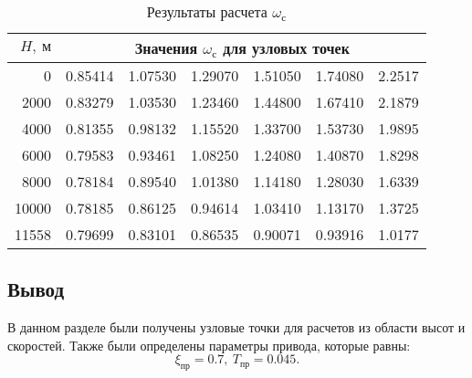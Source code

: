 \begin{table}[H]
    \centering
    \caption{Результаты расчета $\omega_{\text{с}}$}
    \label{tab:driver_tab}
    \begin{tabular}{|r|rrrrrr|}
    \hline
    $H,\ м$ & \multicolumn{6}{c|}{Значения $\omega_с$ для узловых точек}\\
    \hline
0 & 0.85414 & 1.07530 & 1.29070 & 1.51050 & 1.74080 & 2.2517\cellcolor{green} \\
2000 & 0.83279 & 1.03530 & 1.23460 & 1.44800 & 1.67410 &                  2.1879 \\
4000 & 0.81355 & 0.98132 & 1.15520 & 1.33700 & 1.53730 &                  1.9895 \\
6000 & 0.79583 & 0.93461 & 1.08250 & 1.24080 & 1.40870 &                  1.8298 \\
8000 & 0.78184 & 0.89540 & 1.01380 & 1.14180 & 1.28030 &                  1.6339 \\
10000 & 0.78185 & 0.86125 & 0.94614 & 1.03410 & 1.13170 &                  1.3725 \\
11558 & 0.79699 & 0.83101 & 0.86535 & 0.90071 & 0.93916 &                  1.0177 \\
    \hline
    \end{tabular}
\end{table}

\subsection{Вывод}
В данном разделе были получены узловые точки для расчетов из области высот и скоростей. Также были определены параметры привода, которые равны:
\[
    \xi_{пр} = 0.7,\ T_{пр} = 0.045.
\]

